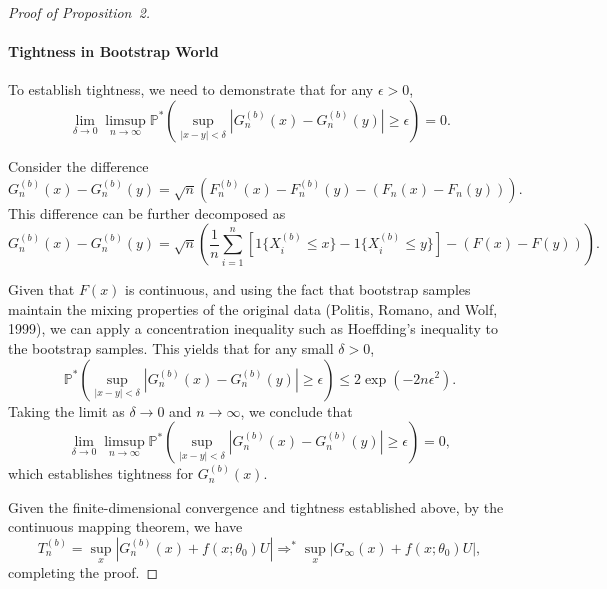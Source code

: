 \documentclass[12pt]{article}
\begin{document}
\begin{proof}[Proof of Proposition~2]
\paragraph{Tightness in Bootstrap World}

To establish tightness, we need to demonstrate that for any \(\epsilon > 0\),
\[
\lim_{\delta \to 0} \limsup_{n \to \infty} \mathbb{P}^*\left( \sup_{|x - y| < \delta} |G_n^{(b)}(x) - G_n^{(b)}(y)| \geq \epsilon \right) = 0.
\]

Consider the difference
\[
G_n^{(b)}(x) - G_n^{(b)}(y) = \sqrt{n} \left( F_n^{(b)}(x) - F_n^{(b)}(y) - (F_n(x) - F_n(y)) \right).
\]
This difference can be further decomposed as
\[
G_n^{(b)}(x) - G_n^{(b)}(y) = \sqrt{n} \left( \frac{1}{n} \sum_{i=1}^n \left[ 1\{X_i^{(b)} \leq x\} - 1\{X_i^{(b)} \leq y\} \right] - (F(x) - F(y)) \right).
\]

Given that \(F(x)\) is continuous, and using the fact that bootstrap
samples maintain the mixing properties of the original data (Politis,
Romano, and Wolf, 1999), we can apply a concentration inequality such
as Hoeffding's inequality to the bootstrap samples. This yields that
for any small \(\delta > 0\),
\[
\mathbb{P}^*\left( \sup_{|x - y| < \delta} |G_n^{(b)}(x) - G_n^{(b)}(y)| \geq \epsilon \right) \leq 2 \exp\left( -2n \epsilon^2 \right).
\]
Taking the limit as \(\delta \to 0\) and \(n \to \infty\), we conclude that
\[
\lim_{\delta \to 0} \limsup_{n \to \infty} \mathbb{P}^*\left( \sup_{|x - y| < \delta} |G_n^{(b)}(x) - G_n^{(b)}(y)| \geq \epsilon \right) = 0,
\]
which establishes tightness for \(G_n^{(b)}(x)\).

\bigskip

Given the finite-dimensional convergence and tightness established
above, by the continuous mapping theorem, we have
\[
T_n^{(b)} = \sup_x \left| G_n^{(b)}(x) + f(x; \theta_0) U \right| \Rightarrow^* \sup_x \left| G_\infty(x) + f(x; \theta_0) U \right|,
\]
completing the proof.

\end{proof}

 

\end{document}
